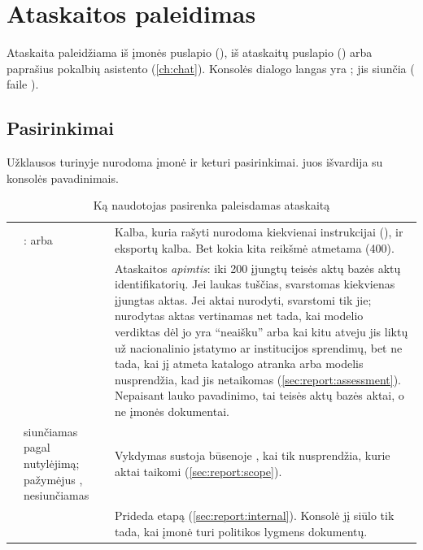 \section{Ataskaitos paleidimas}\label{sec:report:start}

Ataskaita paleidžiama iš įmonės puslapio (), iš ataskaitų
puslapio () arba paprašius pokalbių asistento (\cref{ch:chat}). Konsolės
dialogo langas yra ; jis siunčia
 ( faile ).

\subsection{Pasirinkimai}

Užklausos turinyje nurodoma įmonė ir keturi pasirinkimai.  juos
išvardija su konsolės pavadinimais.

\begin{table}[H]
\caption{Ką naudotojas pasirenka paleisdamas ataskaitą}\label{tab:report:options}
\begin{tabularx}{\textwidth}{@{}L{25mm}L{48mm}Y@{}}
\toprule
{} &  &  \\
\midrule
{} & :  arba  & Kalba, kuria rašyti nurodoma kiekvienai instrukcijai (), ir eksportų kalba. Bet kokia kita reikšmė atmetama (400). \\
 &  & Ataskaitos \emph{apimtis}: iki 200 įjungtų teisės aktų bazės aktų identifikatorių. Jei laukas tuščias, svarstomas kiekvienas įjungtas aktas. Jei aktai nurodyti, svarstomi tik jie; nurodytas aktas vertinamas net tada, kai modelio verdiktas dėl jo yra \enquote{neaišku} arba kai kitu atveju jis liktų už nacionalinio įstatymo ar institucijos sprendimų, bet ne tada, kai jį atmeta katalogo atranka arba modelis nusprendžia, kad jis netaikomas (\cref{sec:report:assessment}). Nepaisant lauko pavadinimo, tai teisės aktų bazės aktai, o ne įmonės dokumentai. \\
 & siunčiamas pagal nutylėjimą; pažymėjus , nesiunčiamas & Vykdymas sustoja būsenoje , kai tik nusprendžia, kurie aktai taikomi (\cref{sec:report:scope}). \\
 &  & Prideda etapą  (\cref{sec:report:internal}). Konsolė jį siūlo tik tada, kai įmonė turi politikos lygmens dokumentų. \\
\bottomrule
\end{tabularx}
\end{table}

